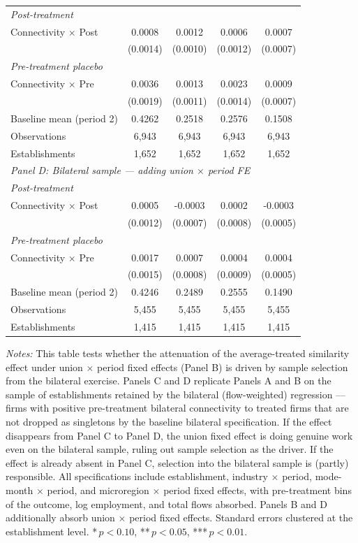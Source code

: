 \begin{table}[H]
\begin{tabular}{lcccc}
\multicolumn{5}{l}{\textit{Post-treatment}} \\
Connectivity $\times$ Post & 0.0008 & 0.0012 & 0.0006 & 0.0007 \\
 & (0.0014) & (0.0010) & (0.0012) & (0.0007) \\
\multicolumn{5}{l}{\textit{Pre-treatment placebo}} \\
Connectivity $\times$ Pre & 0.0036 & 0.0013 & 0.0023 & 0.0009 \\
 & (0.0019) & (0.0011) & (0.0014) & (0.0007) \\
\hline
Baseline mean (period 2) & 0.4262 & 0.2518 & 0.2576 & 0.1508 \\
Observations &        6,943 &        6,943 &        6,943 &        6,943 \\
Establishments &        1,652 &        1,652 &        1,652 &        1,652 \\
\hline
\multicolumn{5}{l}{\textit{Panel D: Bilateral sample — adding union $\times$ period FE}} \\
\multicolumn{5}{l}{\textit{Post-treatment}} \\
Connectivity $\times$ Post & 0.0005 & -0.0003 & 0.0002 & -0.0003 \\
 & (0.0012) & (0.0007) & (0.0008) & (0.0005) \\
\multicolumn{5}{l}{\textit{Pre-treatment placebo}} \\
Connectivity $\times$ Pre & 0.0017 & 0.0007 & 0.0004 & 0.0004 \\
 & (0.0015) & (0.0008) & (0.0009) & (0.0005) \\
\hline
Baseline mean (period 2) & 0.4246 & 0.2489 & 0.2555 & 0.1490 \\
Observations &        5,455 &        5,455 &        5,455 &        5,455 \\
Establishments &        1,415 &        1,415 &        1,415 &        1,415 \\
\hline\hline
\end{tabular}
\begin{minipage}{\linewidth}
\smallskip
\scriptsize\textit{Notes:} This table tests whether the attenuation of the average-treated similarity effect under union $\times$ period fixed effects (Panel B) is driven by sample selection from the bilateral exercise. Panels C and D replicate Panels A and B on the sample of establishments retained by the bilateral (flow-weighted) regression — firms with positive pre-treatment bilateral connectivity to treated firms that are not dropped as singletons by the baseline bilateral specification. If the effect disappears from Panel C to Panel D, the union fixed effect is doing genuine work even on the bilateral sample, ruling out sample selection as the driver. If the effect is already absent in Panel C, selection into the bilateral sample is (partly) responsible. All specifications include establishment, industry $\times$ period, mode-month $\times$ period, and microregion $\times$ period fixed effects, with pre-treatment bins of the outcome, log employment, and total flows absorbed. Panels B and D additionally absorb union $\times$ period fixed effects. Standard errors clustered at the establishment level. *\,$p<0.10$, **\,$p<0.05$, ***\,$p<0.01$.

\end{minipage}
\end{table}
